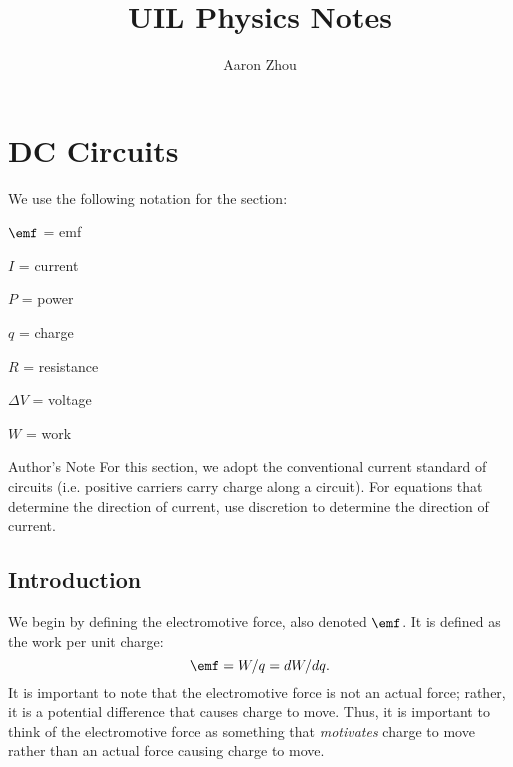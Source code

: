 \documentclass{article}
\title{UIL Physics Notes}
\author{Aaron Zhou}
\begin{document}
\maketitle

{
    \hypersetup{linkcolor=black}
    \tableofcontents
}

\newpage
\section{DC Circuits}

We use the following notation for the section: 

\vspace{15px}

\begin{tcolorbox}
\begin{multicols}{4}
\begin{description}
    \item $\emf$ = emf
    \item $I$ = current
    \item $P$ = power
    \item $q$ = charge
    \item $R$ = resistance
    \item $\Delta V$ = voltage
    \item $W$ = work
\end{description}
\end{multicols}
\end{tcolorbox}

\begin{textbox}{Author's Note}
    For this section, we adopt the conventional current standard of circuits (i.e. positive carriers carry charge along a circuit). For equations that determine the direction of current, use discretion to determine the direction of current. 
\end{textbox}

\subsection{Introduction}
\vspace{10px}
We begin by defining the electromotive force, also denoted $\emf$. It is defined as the work per unit charge:
\begin{equation}
    \emf = W/q = dW/dq.
\end{equation}
It is important to note that the electromotive force is not an actual force; rather, it is a potential difference that causes charge to move. Thus, it is important to think of the electromotive force as something that \textit{motivates} charge to move rather than an actual force causing charge to move. 
\end{document}
